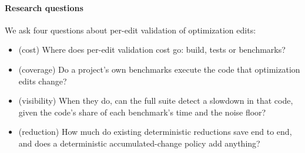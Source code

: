 \paragraph*{Research questions}
We ask four questions about per-edit validation of optimization edits:
\begin{itemize}
\item[\textbf{RQ1}] (cost) Where does per-edit validation cost go: build, tests or benchmarks?
\item[\textbf{RQ2}] (coverage) Do a project's own benchmarks execute the code that optimization edits change?
\item[\textbf{RQ3}] (visibility) When they do, can the full suite detect a slowdown in that code, given the code's share of each benchmark's time and the noise floor?
\item[\textbf{RQ4}] (reduction) How much do existing deterministic reductions save end to end, and does a deterministic accumulated-change policy add anything?
\end{itemize}

